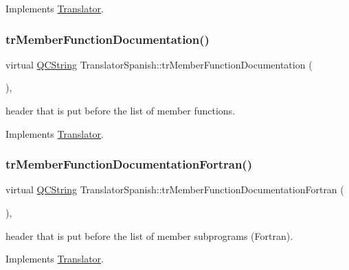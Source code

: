 Implements \mbox{\hyperlink{class_translator}{Translator}}.

\mbox{\label{class_translator_spanish_a34172a2c4afb0cd481441c767b00f568}} 
\subsubsection{\texorpdfstring{trMemberFunctionDocumentation()}{trMemberFunctionDocumentation()}}
{\footnotesize\ttfamily virtual \mbox{\hyperlink{class_q_c_string}{Q\+C\+String}} Translator\+Spanish\+::tr\+Member\+Function\+Documentation (\begin{DoxyParamCaption}{ }\end{DoxyParamCaption})\hspace{0.3cm}{\ttfamily [inline]}, {\ttfamily [virtual]}}

header that is put before the list of member functions. 

Implements \mbox{\hyperlink{class_translator}{Translator}}.

\mbox{\label{class_translator_spanish_a6518365a4b55f1d64ef96fd409e81c22}} 
\subsubsection{\texorpdfstring{trMemberFunctionDocumentationFortran()}{trMemberFunctionDocumentationFortran()}}
{\footnotesize\ttfamily virtual \mbox{\hyperlink{class_q_c_string}{Q\+C\+String}} Translator\+Spanish\+::tr\+Member\+Function\+Documentation\+Fortran (\begin{DoxyParamCaption}{ }\end{DoxyParamCaption})\hspace{0.3cm}{\ttfamily [inline]}, {\ttfamily [virtual]}}

header that is put before the list of member subprograms (Fortran). 

Implements \mbox{\hyperlink{class_translator}{Translator}}.

